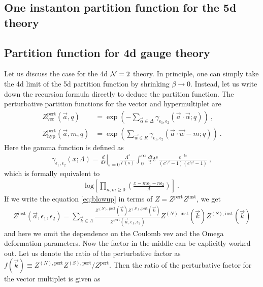 \documentclass[letterpaper, 11pt]{article}
\def\CN{{\cal N}}
\def\a{\alpha}
\def\e{\epsilon}
\begin{document}
\subsection{One instanton partition function for the 5d theory}


\subsection{Partition function for 4d gauge theory}
Let us discuss the case for the 4d $\CN=2$ theory. In principle, one can simply take the 4d limit of the 5d partition function by shrinking $\beta \to 0$. Instead, let us write down the recursion formula directly to deduce the partition function. 
The perturbative partition functions for the vector and hypermultiplet are
\begin{align}
 Z_{\textrm{vec}}^{\textrm{pert}}(\vec{a}, q) &= \exp \left( - \sum_{\vec \a \in \Delta} \gamma_{\e_1, \e_2}  (\vec{a} \cdot {\vec{\a}}; q )\right) \ , \\
 Z_{\textrm{hyp}}^{\textrm{pert}} (\vec{a}, m, q)&= \exp \left( \sum_{\vec{w} \in R} \gamma_{\e_1, \e_2} ( \vec{a} \cdot {\vec{w}} - m; q)\right) \ . 
\end{align}
Here the gamma function is defined as
\begin{align}
 \gamma_{\e_1, \e_2} (x; \Lambda) = \left. \frac{d}{ds} \right|_{s=0} \frac{\Lambda^s}{\Gamma(s)} \int_0^{\infty} \frac{dt}{t} t^s \frac{e^{-ts}}{(e^{\e_1 t} - 1)(e^{\e_2 t} - 1)} \ , 
\end{align}
which is formally equivalent to 
\begin{align}
 \textrm{log} \left[\prod_{n, m\ge 0} \left( \frac{x - m\e_1 - n \e_2}{\Lambda} \right) \right] \ . 
\end{align}
If we write the equation \eqref{eq:blowup} in terms of $Z = Z^{\textrm{pert}} Z^{\textrm{inst}}$, we get
\begin{align}
 Z^{\textrm{inst}}(\vec{a}, \e_1, \e_2) = \sum_{\vec{k} \in \Lambda} \frac{Z^{(N), \textrm{pert}}(\vec{k}) Z^{(S), \textrm{pert}}(\vec{k})}{Z^{\textrm{pert}}(\vec{a}, \e_1, \e_2)} Z^{(N), \textrm{inst}}(\vec{k} ) Z^{(S), \textrm{inst}}(\vec{k})
\end{align}
and here we omit the dependence on the Coulomb vev and the Omega deformation parameters. 
Now the factor in the middle can be explicitly worked out. Let us denote the ratio of the perturbative factor as $f(\vec{k}) \equiv Z^{(N), \textrm{pert}} Z^{(S), \textrm{pert}}/Z^{\textrm{pert}}$. 
Then the ratio of the perturbative factor for the vector multiplet is given as
\end{document}
